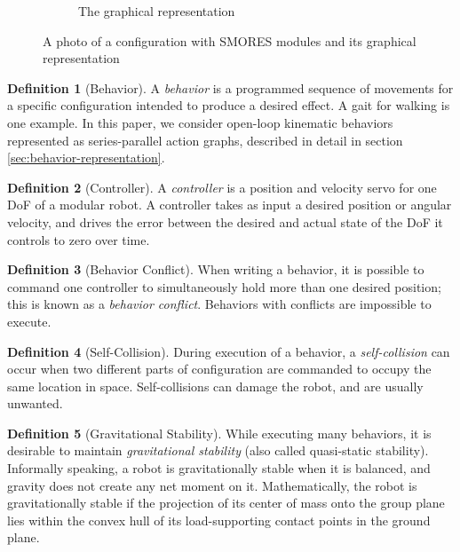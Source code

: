 \documentclass[conference]{IEEEtran}
\theoremstyle{definition}
\newtheorem{definition}{Definition}[section]
\begin{document}
\begin{figure}
\begin{center}
\begin{subfigure}[b]{0.4\columnwidth}
                \caption{The graphical representation}
                \label{fig:smores_conf_graph}
        \end{subfigure}
\end{center}
\caption{A photo of a configuration with SMORES modules and its graphical representation}
\label{fig:smores_conf}
\end{figure}



\begin{definition}[Behavior]
A \textit{behavior} is a programmed sequence of movements for a specific configuration
intended to produce a desired effect.  A gait for walking is one example.  In
this paper, we consider open-loop kinematic behaviors represented as
series-parallel action graphs, described in detail in section
\ref{sec:behavior-representation}.
\end{definition}
\begin{definition}[Controller]
A \textit{controller} is a position and velocity servo for one DoF of a modular
robot.  A controller takes as input a desired position or angular velocity, and
drives the error between the desired and actual state of the DoF it controls to
zero over time.
\end{definition}
\begin{definition}[Behavior Conflict]
When writing a behavior, it is possible to command one controller to
simultaneously hold more than one desired position; this is known as a
\textit{behavior conflict}.  Behaviors with conflicts are
impossible to execute.
\end{definition}
\begin{definition}[Self-Collision]
During execution of a behavior, a \textit{self-collision} can occur when two
different parts of configuration are commanded to occupy the same location in
space.  Self-collisions can damage the robot, and are usually unwanted.
\end{definition}
\begin{definition}[Gravitational Stability]
While executing many behaviors, it is desirable to maintain \textit{gravitational
stability} (also called quasi-static stability).  Informally speaking, a
robot is gravitationally stable when it is balanced, and gravity does not
create any net moment on it.  Mathematically, the robot is gravitationally stable
if the projection of its center of
mass onto the group plane lies within the convex hull of its load-supporting contact points in the
ground plane.
\end{definition}
\end{document}
